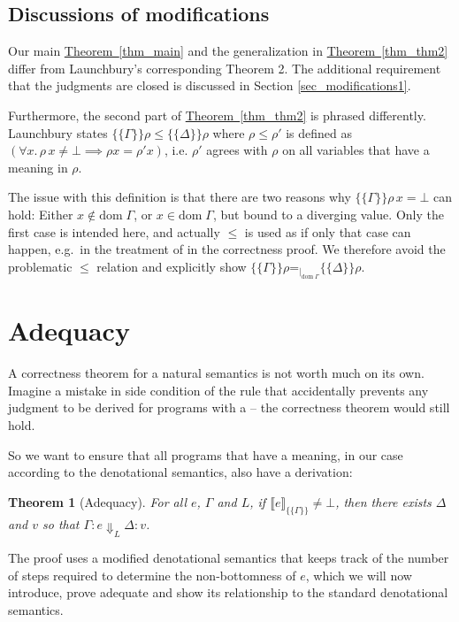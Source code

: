 \documentclass{jfp1}
\newcommand{\myref}[2]{\hyperref[#2]{#1~\ref*{#2}}}
\newtheorem{theorem}{Theorem}
\theoremstyle{nonumberbreak}
\newcommand{\keyword}[1]{\text{\textsf{#1}}}
\newcommand{\sred}[5]{#1 : #2 \Downarrow_{#3} #4 : #5}
\newcommand{\sRule}[1]{\text{{\textsc{#1}}}}
\newcommand{\dom}[1]{\text{dom}\;#1}
\newcommand{\dsem}[2]{\llbracket #1 \rrbracket_{#2}}
\newcommand{\esem}[1]{\{\!\!\!\{#1\}\!\!\!\}}
\newcommand{\eqon}[1]{\mathrel{\mathord=_{\mathord|_{#1}}}}
\begin{document}
\subsection{Discussions of modifications}
\label{sec_modifications2}

Our main \myref{Theorem}{thm_main} and the generalization in \myref{Theorem}{thm_thm2} differ from Launchbury's corresponding Theorem 2. The additional requirement that the judgments are closed is discussed in Section \ref{sec_modifications1}.

Furthermore, the second part of \myref{Theorem}{thm_thm2} is phrased differently. Launchbury states  $\esem\Gamma\rho \le \esem\Delta\rho$ where $\rho \le \rho'$ is defined as $(\forall x.\, \rho\,x \ne \bot \implies \rho x = \rho' x)$, i.e. $\rho'$ agrees with $\rho$ on all variables that have a meaning in $\rho$.

The issue with this definition is that there are two reasons why $\esem\Gamma\rho\,x=\bot$ can hold: Either $x \notin \dom\Gamma$, or $x \in \dom\Gamma$, but bound to a diverging value. Only the first case is intended here, and actually $\le$ is used as if only that case can happen, e.g.\ in the treatment of \sRule{Var} in the correctness proof. We therefore avoid the problematic $\le$ relation and explicitly show  $\esem\Gamma\rho \eqon{\dom\Gamma}  \esem\Delta\rho$.


\section{Adequacy}

A correctness theorem for a natural semantics is not worth much on its own. Imagine a mistake in side condition of the \sRule{Let} rule that accidentally prevents any judgment to be derived for programs with a \keyword{let} -- the correctness theorem would still hold.

So we want to ensure that all programs that have a meaning, in our case according to the denotational semantics, also have a derivation:

\begin{theorem}[Adequacy]
For all $e$, $\Gamma$ and $L$, if $\dsem{e}{\esem{\Gamma}} \ne \bot$, then there exists $\Delta$ and $v$ so that $\sred \Gamma e L \Delta v$.
\label{thm_adequacy}
\end{theorem}

The proof uses a modified denotational semantics that keeps track of the number of steps required to determine the non-bottomness of $e$, which we will now introduce, prove adequate and show its relationship to the standard denotational semantics.
\end{document}
